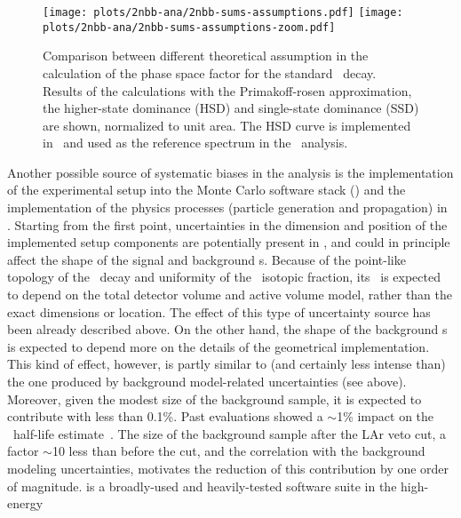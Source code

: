 \begin{description}[wide]
    \begin{figure}
      \centering
      \texttt{[image: plots/2nbb-ana/2nbb-sums-assumptions.pdf]}%
      \texttt{[image: plots/2nbb-ana/2nbb-sums-assumptions-zoom.pdf]}
      \caption{%
        Comparison between different theoretical assumption in the calculation of the
        phase space factor for the standard \nnbb\ decay. Results of the calculations with
        the Primakoff-rosen approximation, the higher-state dominance (HSD) and
        single-state dominance (SSD) are shown, normalized to unit area. The HSD curve is
        implemented in \decayzero\ and used as the reference spectrum in the \nnbb\
        analysis.
      }\label{fig:2nbb-ana:theoretical-spectrum}
    \end{figure}

  \item[\mage\ and \geant{}] Another possible source of systematic biases in the analysis
    is the implementation of the experimental setup into the Monte Carlo software stack
    (\mage) and the implementation of the physics processes (particle generation and
    propagation) in \geant. Starting from the first point, uncertainties in the dimension
    and position of the implemented setup components are potentially present in \mage, and
    could in principle affect the shape of the signal and background \pdf{}s. Because of the
    point-like topology of the \nnbb\ decay and uniformity of the \gesix\ isotopic
    fraction, its \pdf\ is expected to depend on the total detector volume and active volume
    model, rather than the exact dimensions or location. The effect of this type of
    uncertainty source has been already described above. On the other hand, the shape
    of the background \pdf{}s is expected to depend more on the details of the geometrical
    implementation. This kind of effect, however, is partly similar to (and certainly less
    intense than) the one produced by background model-related uncertainties (see above).
    Moreover, given the modest size of the background sample, it is expected to contribute
    with less than 0.1\%. Past evaluations showed a $\sim$1\% impact on the \nnbb\
    half-life estimate~\cite{Agostini2012a, Agostini2015a}. The size of the
    background sample after the LAr veto cut, a factor $\sim$10 less than before the cut,
    and the correlation with the background modeling uncertainties, motivates the
    reduction of this contribution by one order of magnitude.
    \newpar
    \geant{} is a broadly-used and heavily-tested software suite in the high-energy

\end{description}

